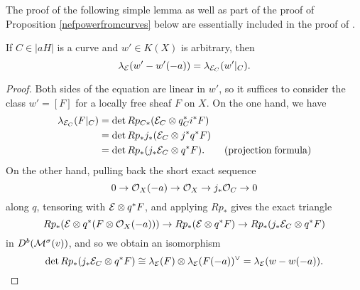 The proof of the following simple lemma as well as part of the proof of Proposition \ref{nefpowerfromcurves} below are essentially included in the proof of \cite[Proposition 8.2.3]{HL}.

\begin{lem}\label{Ktheorylemma}
    If $C \in |a H|$ is a curve and $w' \in K(X)$ is arbitrary, then
    \[ \lambda_{\mathcal{E}}(w' - w'(-a)) = \lambda_{\mathcal{E}_C}(w'|_C). \]
\end{lem}
\begin{proof}
    Both sides of the equation are linear in $w'$, so it suffices to consider the class $w' = [F]$ for a locally free sheaf $F$ on $X$. On the one hand, we have
    \begin{align*}
        \lambda_{\mathcal{E}_C}(F|_C) & = \det R p_{C*}(\mathcal{E}_C \otimes q_C^* i^* F) \\
        & = \det R p_* j_*(\mathcal{E}_C \otimes j^* q^* F) \\
        & = \det R p_* (j_*\mathcal{E}_C \otimes q^* F). \qquad \mathrm{(projection\;formula)}
    \end{align*}
    On the other hand, pulling back the short exact sequence 
    \[ 0 \to \mathcal{O}_X(-a) \to \mathcal{O}_X \to j_* \mathcal{O}_C \to 0 \]
    along $q$, tensoring with $\mathcal{E} \otimes q^* F$, and applying $R p_*$ gives the exact triangle
    \[ R p_* (\mathcal{E} \otimes q^*(F \otimes \mathcal{O}_X(-a))) \to R p_* (\mathcal{E} \otimes q^*F) \to R p_* (j_* \mathcal{E}_C \otimes q^*F) \]
    in $D^b(\mathcal{M}^\sigma(v))$, and so we obtain an isomorphism
    \[ \det R p_* (j_* \mathcal{E}_C \otimes q^*F) \cong \lambda_{\mathcal{E}}(F) \otimes \lambda_{\mathcal{E}}(F(-a))^\vee = \lambda_{\mathcal{E}}(w - w(-a)). \]
\end{proof}

